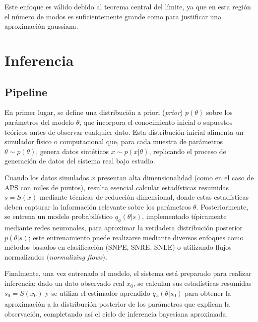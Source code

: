 \documentclass[11pt]{article}
\begin{document}
Este enfoque es válido debido al teorema central del límite, ya que en esta región el número de modos es suficientemente grande como para justificar una aproximación gaussiana.

\section{Inferencia}
\subsection{Pipeline}
En primer lugar, se define una distribución a priori (\emph{prior}) $p(\theta)$ sobre los parámetros del modelo $\theta$, que incorpora el conocimiento inicial o supuestos teóricos antes de observar cualquier dato. Esta distribución inicial alimenta un simulador físico o computacional que, para cada muestra de parámetros $\theta \sim p(\theta)$, genera datos sintéticos $x \sim p(x|\theta)$, replicando el proceso de generación de datos del sistema real bajo estudio.

Cuando los datos simulados $x$ presentan alta dimensionalidad (como en el caso de APS con miles de puntos), resulta esencial calcular estadísticas resumidas $s = S(x)$ mediante técnicas de reducción dimensional, donde estas estadísticas deben capturar la información relevante sobre los parámetros $\theta$. Posteriormente, se entrena un modelo probabilístico $q_\phi(\theta|s)$, implementado típicamente mediante redes neuronales, para aproximar la verdadera distribución posterior $p(\theta|s)$; este entrenamiento puede realizarse mediante diversos enfoques como métodos basados en clasificación (SNPE, SNRE, SNLE) o utilizando flujos normalizados (\emph{normalizing flows}).

Finalmente, una vez entrenado el modelo, el sistema está preparado para realizar inferencia: dado un dato observado real $x_0$, se calculan sus estadísticas resumidas $s_0 = S(x_0)$ y se utiliza el estimador aprendido $q_\phi(\theta|s_0)$ para obtener la aproximación a la distribución posterior de los parámetros que explican la observación, completando así el ciclo de inferencia bayesiana aproximada. 
\end{document}
